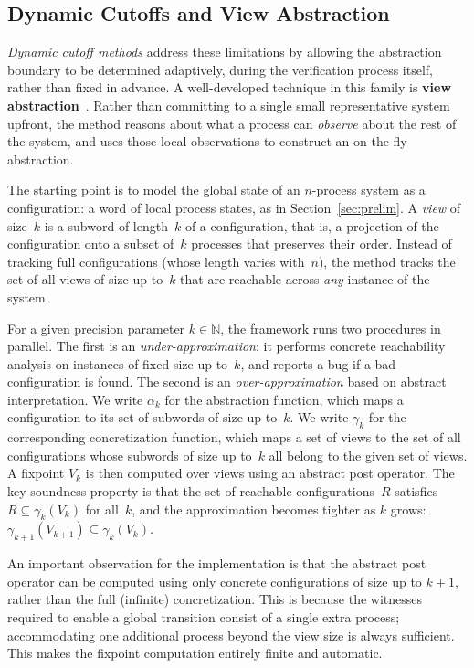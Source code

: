\subsection{Dynamic Cutoffs and View Abstraction}

\emph{Dynamic cutoff methods} address these limitations by allowing the
abstraction boundary to be determined adaptively, during the verification
process itself, rather than fixed in advance. A well-developed technique in
this family is \textbf{view abstraction}~\cite{AHH13,AHH16}.
Rather than committing to a single small representative system upfront, the
method reasons about what a process can \emph{observe} about the rest of the
system, and uses those local observations to construct an on-the-fly
abstraction.

The starting point is to model the global state of an $n$-process system as a
configuration: a word of local process states, as in
Section~\ref{sec:prelim}. A \emph{view} of size~$k$ is a subword of length~$k$
of a configuration, that is, a projection of the configuration onto a subset
of~$k$ processes that preserves their order. Instead of tracking full
configurations (whose length varies with~$n$), the method tracks the set of
all views of size up to~$k$ that are reachable across \emph{any} instance of
the system.

For a given precision parameter $k \in \mathbb{N}$, the framework runs two
procedures in parallel. The first is an \emph{under-approximation}: it
performs concrete reachability analysis on instances of fixed size up to~$k$,
and reports a bug if a bad configuration is found. The second is an
\emph{over-approximation} based on abstract interpretation. We write
$\alpha_k$ for the abstraction function, which maps a configuration to its set
of subwords of size up to~$k$. We write $\gamma_k$ for the corresponding
concretization function, which maps a set of views to the set of all
configurations whose subwords of size up to~$k$ all belong to the given set of
views. A fixpoint $V_k$ is then computed over
views using an abstract post operator. The key soundness property is that the
set of reachable configurations~$R$ satisfies $R \subseteq \gamma_k(V_k)$ for
all~$k$, and the approximation becomes tighter as $k$ grows:
$\gamma_{k+1}(V_{k+1}) \subseteq \gamma_k(V_k)$.

An important observation for the implementation is that the abstract post
operator can be computed using only concrete configurations of size up to $k{+}1$, rather than
the full (infinite) concretization. This is because the witnesses required to
enable a global transition consist of a single extra process; accommodating
one additional process beyond the view size is always sufficient. This makes
the fixpoint computation entirely finite and automatic.

